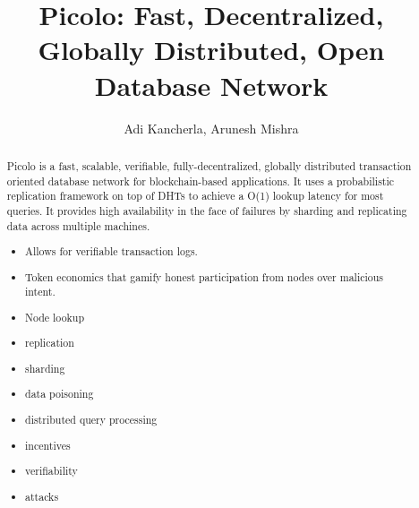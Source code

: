 \documentclass[preprint,12pt]{elsarticle}
\begin{document}
\begin{frontmatter}


\title{Picolo: Fast, Decentralized, Globally Distributed, Open Database Network}

\author{Adi Kancherla, Arunesh Mishra}
\address{San Francisco, California}




\begin{abstract}
Picolo is a fast, scalable, verifiable, fully-decentralized, globally distributed transaction oriented database network for
blockchain-based applications. It uses a probabilistic replication framework on top of DHTs to achieve a O(1)
lookup latency for most queries. It provides high availability in the face of failures by sharding and replicating data across multiple machines.


\begin{itemize}
    \item Allows for verifiable transaction logs.
    \item Token economics that gamify honest participation from nodes over malicious intent.
    \item Node lookup 
    \item replication
    \item sharding
    \item data poisoning
    \item distributed query processing
    \item incentives
    \item verifiability
    \item attacks
\end{itemize}
\end{abstract}


\end{frontmatter}
\end{document}
